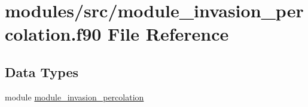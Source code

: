 \hypertarget{module__invasion__percolation_8f90}{
\section{modules/src/module\-\_\-invasion\-\_\-percolation.f90 \-File \-Reference}
\label{module__invasion__percolation_8f90}
}
\subsection*{\-Data \-Types}
\begin{DoxyCompactItemize}
\item 
module \hyperlink{classmodule__invasion__percolation}{module\-\_\-invasion\-\_\-percolation}
\end{DoxyCompactItemize}
